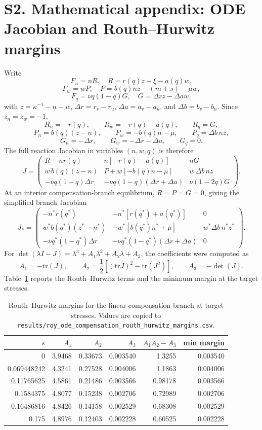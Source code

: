 \documentclass[11pt]{article}
\begin{document}
\section*{S2. Mathematical appendix: ODE Jacobian and Routh--Hurwitz margins}

Write
\[
F_n=nR,\quad R=r(q)z-\xi-a(q)w,
\]
\[
F_w=wP,\quad P=b(q)nz-(m+s)-\mu w,
\]
\[
F_q=\nu q(1-q)G,\quad G=\Delta r z-\Delta a w,
\]
with \(z=\kappa^{-1}-n-w\), \(\Delta r=r_v-r_u\), \(\Delta a=a_v-a_u\), and \(\Delta b=b_v-b_u\). Since \(z_n=z_w=-1\),
\[
R_n=-r(q),\qquad R_w=-r(q)-a(q),\qquad R_q=G,
\]
\[
P_n=b(q)(z-n),\qquad P_w=-b(q)n-\mu,\qquad P_q=\Delta b\,nz,
\]
\[
G_n=-\Delta r,\qquad G_w=-\Delta r-\Delta a,\qquad G_q=0.
\]
The full reaction Jacobian in variables \((n,w,q)\) is therefore
\[
J=
\begin{pmatrix}
R-nr(q) & n[-r(q)-a(q)] & nG\\
w\,b(q)(z-n) & P+w[-b(q)n-\mu] & w\,\Delta b\,nz\\
-\nu q(1-q)\Delta r & -\nu q(1-q)(\Delta r+\Delta a) & \nu(1-2q)G
\end{pmatrix}.
\]
At an interior compensation-branch equilibrium, \(R=P=G=0\), giving the simplified branch Jacobian
\[
J_*=
\begin{pmatrix}
-n^*r(q^*) & -n^*[r(q^*)+a(q^*)] & 0\\
w^*b(q^*)(z^*-n^*) & -w^*[b(q^*)n^*+\mu] & w^*\Delta b\,n^*z^*\\
-\nu q^*(1-q^*)\Delta r & -\nu q^*(1-q^*)(\Delta r+\Delta a) & 0
\end{pmatrix}.
\]
For \(\det(\lambda I-J)=\lambda^3+A_1\lambda^2+A_2\lambda+A_3\), the coefficients were computed as
\[
A_1=-\mathrm{tr}(J),\qquad
A_2=\frac{1}{2}\left[(\mathrm{tr}J)^2-\mathrm{tr}(J^2)\right],\qquad
A_3=-\det(J).
\]
Table~\ref{tab:rh-margins} reports the Routh--Hurwitz terms and the minimum margin at the target stresses.

\begin{table}[htbp]
  \centering
  \caption{Routh--Hurwitz margins for the linear compensation branch at target stresses. Values are copied to \texttt{results/roy\_ode\_compensation\_routh\_hurwitz\_margins.csv}.}
  \label{tab:rh-margins}
  \small
  \begin{tabular}{rrrrrr}
    \toprule
    \(s\) & \(A_1\) & \(A_2\) & \(A_3\) & \(A_1A_2-A_3\) & min margin \\
    \midrule
    0 & 3.9468 & 0.33673 & 0.003540 & 1.3255 & 0.003540 \\
    0.069448242 & 4.3241 & 0.27528 & 0.004006 & 1.1863 & 0.004006 \\
    0.11765625 & 4.5861 & 0.21486 & 0.003566 & 0.98178 & 0.003566 \\
    0.1584375 & 4.8077 & 0.15238 & 0.002706 & 0.72989 & 0.002706 \\
    0.16486816 & 4.8426 & 0.14158 & 0.002529 & 0.68308 & 0.002529 \\
    0.175 & 4.8976 & 0.12403 & 0.002228 & 0.60525 & 0.002228 \\
    \bottomrule
  \end{tabular}
\end{table}
\end{document}
